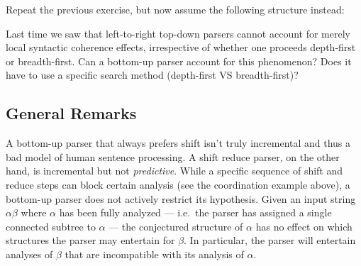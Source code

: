 \begin{exercise}
    Repeat the previous exercise, but now assume the following structure instead:
    \begin{center}
    \end{center}
    \label{ex:BottomUp_RightEmbedding}
\end{exercise}

\begin{exercise}
    Last time we saw that left-to-right top-down parsers cannot account for merely local syntactic coherence effects, irrespective of whether one proceeds depth-first or breadth-first.
    Can a bottom-up parser account for this phenomenon?
    Does it have to use a specific search method (depth-first VS breadth-first)?
\end{exercise}

\subsection{General Remarks}
\label{sub:BottomUp_Remarks}

A bottom-up parser that always prefers shift isn't truly incremental and thus a bad model of human sentence processing.
A shift reduce parser, on the other hand, is incremental but not \emph{predictive}.
While a specific sequence of shift and reduce steps can block certain analysis (see the coordination example above), a bottom-up parser does not actively restrict its hypothesis.
Given an input string $\alpha\beta$ where $\alpha$ has been fully analyzed --- i.e.\ the parser has assigned a single connected subtree to $\alpha$ --- the conjectured structure of $\alpha$ has no effect on which structures the parser may entertain for $\beta$.
In particular, the parser will entertain analyses of $\beta$ that are incompatible with its analysis of $\alpha$.

